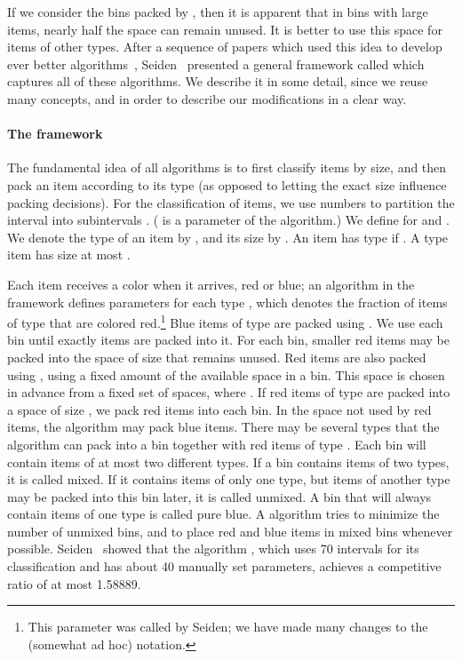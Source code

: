 If we consider the bins packed by \harm, then
it is apparent that in bins with large items, nearly half the space can remain
unused. It is better to use this space for items of other types.
After a sequence of papers which used this idea to develop ever better algorithms~\cite{LeeLee85,RaBrLL89,Richey91},
Seiden~\cite{Seiden02} presented a general framework called {\SuperH} which captures all of these algorithms. We describe it in some detail, since we reuse many concepts,
and in order to describe our modifications in a clear way.

\paragraph{The {\SuperH} framework~\cite{Seiden02}}

The fundamental idea of all \SuperH{} algorithms is to first classify items by
size, and then pack an item according to its type (as opposed to
letting the exact size influence packing decisions).
For the classification of items, we use numbers  to 
partition the interval
 into subintervals .
( is a parameter of the algorithm.)
 We define 
for  and .
We denote the type of an item  by , and its size by .
An item  has type  if . 
A type  item has size at most . 

Each item receives a color when it arrives, red or blue; an algorithm in the {\SuperH} framework defines parameters  for each type , which denotes the fraction of items of type  that are colored red.\footnote{This parameter was called  by Seiden; we have made many changes to the (somewhat ad hoc) notation.}
Blue items of type  are packed using \nf{}. We use each bin until 
exactly  items are packed into it.
For each bin, smaller red items may be packed into the space 
of size  that remains unused. 
Red items are also packed using \nf{}, using a fixed amount of the available space in a bin. 
This space is chosen in advance from a fixed set  of spaces, where . 
If red items of type  are packed into a space of size , we pack  red items into each bin.
In the space not used by red items, the algorithm may pack blue items.
There may be several types that the algorithm can pack into a bin together with red items of type .
Each bin will contain items of at most two different types.
If a bin contains items of two types, it is called mixed. If it contains items of only one type, but items of another type may be packed into this bin later, it is called unmixed. 
A bin that will always contain items of one type is called pure blue. A {\SuperH} algorithm tries to minimize the number of unmixed bins,
and to place red and blue items in mixed bins whenever possible. 
Seiden~\cite{Seiden02} showed that the {\SuperH} algorithm {\Hpp}, which uses 70
intervals for its classification and has about 40 manually set
parameters, achieves a competitive ratio of at most 1.58889.


